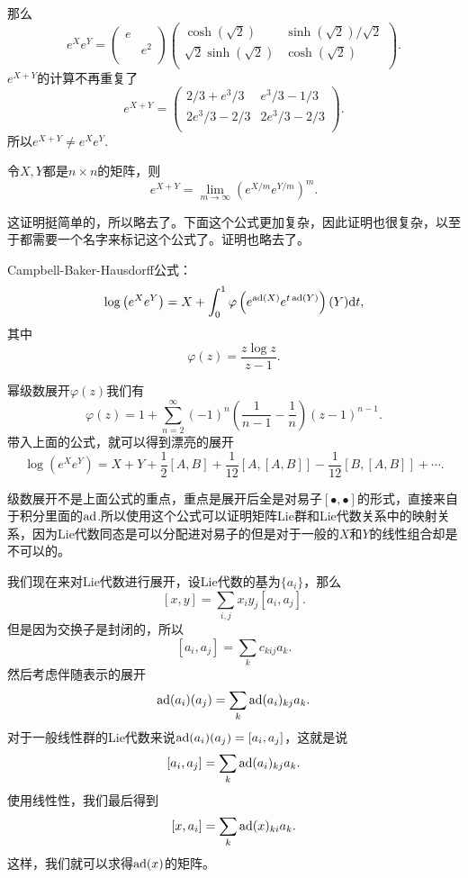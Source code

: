 那么
\[
e^Xe^Y=
\begin{pmatrix}
e&\\
&e^2\\
\end{pmatrix}
\begin{pmatrix}
\cosh \left(\sqrt{2}\right)&\sinh \left(\sqrt{2}\right)/\sqrt{2}\\
\sqrt{2} \sinh \left(\sqrt{2}\right)&\cosh \left(\sqrt{2}\right)\\
\end{pmatrix}.
\]
$e^{X+Y}$的计算不再重复了
\[
e^{X+Y}=\begin{pmatrix}
 2/3+e^3/3 & e^3/3-1/3 \\
 2 e^3/3-2/3 & 2 e^3/3-2/3 \\
\end{pmatrix}.
\]
所以$e^{X+Y}\neq e^Xe^Y$.

\pro
令$X,Y$都是$n\times n$的矩阵，则
\[
	e^{X+Y}=\lim_{m\to\infty}\left(e^{X/m}e^{Y/m}\right)^m.
\]

这证明挺简单的，所以略去了。下面这个公式更加复杂，因此证明也很复杂，以至于都需要一个名字来标记这个公式了。证明也略去了。

\theo Campbell-Baker-Hausdorff公式：
\[
\log\left(e^Xe^Y\right)=X+\int_0^1 \varphi\left(e^{\operatorname{ad}(X)}e^{t\operatorname{ad}(Y)}\right)(Y)\mathrm{d} t,
\]
其中
\[
\varphi(z)=\frac{z\log z}{z-1}.
\]

幂级数展开$\varphi(z)$我们有
\[
	\varphi(z)=1+\sum_{n=2}^\infty (-1)^n\left(\frac{1}{n-1}-\frac{1}{n}\right)(z-1)^{n-1}.
\]
带入上面的公式，就可以得到漂亮的展开
\[
\log\left(e^Xe^Y\right)=X+Y+\frac{1}{2}[A,B]+\frac{1}{12}[A,[A,B]]-\frac{1}{12}[B,[A,B]]+\cdots.
\]

级数展开不是上面公式的重点，重点是展开后全是对易子$[\bullet,\bullet]$的形式，直接来自于积分里面的$\operatorname{ad}$.所以使用这个公式可以证明矩阵Lie群和Lie代数关系中的映射关系，因为Lie代数同态是可以分配进对易子的但是对于一般的$X$和$Y$的线性组合却是不可以的。

我们现在来对Lie代数进行展开，设Lie代数的基为$\{a_i\}$，那么
\[
[x,y]=\sum_{i,j}x_iy_j[a_i,a_j].
\]
但是因为交换子是封闭的，所以
\[
	[a_i,a_j]=\sum_k c_{kij}a_k.
\]
然后考虑伴随表示的展开
\[
	\operatorname{ad}(a_i)(a_j)=\sum_k \operatorname{ad}(a_i)_{kj}a_k.
\]
对于一般线性群的Lie代数来说$\operatorname{ad}(a_i)(a_j)=[a_i,a_j]$，这就是说
\[
	[a_i,a_j]=\sum_k \operatorname{ad}(a_i)_{kj}a_k.
\]
使用线性性，我们最后得到
\[
	[x,a_i]=\sum_k \operatorname{ad}(x)_{ki}a_k.
\]
这样，我们就可以求得$\operatorname{ad}(x)$的矩阵。

